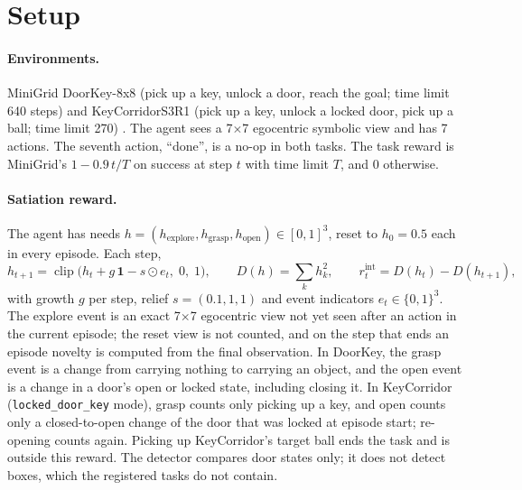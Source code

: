 \documentclass[11pt,letterpaper]{article}
\begin{document}
\section{Setup}
\label{sec:setup}

\paragraph{Environments.}
MiniGrid DoorKey-8x8 (pick up a key, unlock a door, reach the goal; time limit 640 steps) and KeyCorridorS3R1 (pick
up a key, unlock a locked door, pick up a ball; time limit 270) \citep{chevalier2023minigrid}. The agent sees a
7$\times$7 egocentric symbolic view and has 7 actions. The seventh action, ``done'', is a no-op in both tasks. The
task reward is MiniGrid's $1-0.9\,t/T$ on success at step $t$ with time limit $T$, and 0 otherwise.

\paragraph{Satiation reward.}
The agent has needs $h=(h_{\text{explore}},h_{\text{grasp}},h_{\text{open}})\in[0,1]^3$, reset to $h_0=0.5$ each
in every episode. Each step,
\begin{equation}
  h_{t+1}=\operatorname{clip}\bigl(h_t+g\,\mathbf{1}-s\odot e_t,\;0,\;1\bigr),\qquad
  D(h)=\textstyle\sum_k h_k^2,\qquad r^{\text{int}}_t=D(h_t)-D(h_{t+1}),
  \label{eq:sat}
\end{equation}
with growth $g$ per step, relief $s=(0.1,1,1)$ and event indicators $e_t\in\{0,1\}^3$. The explore event is an
exact 7$\times$7 egocentric view not yet seen after an action in the current episode; the reset view is not counted,
and on the step that ends an episode novelty is computed from the final observation. In DoorKey, the grasp event is
a change from carrying nothing to carrying an object, and the open event is a change in a door's open or locked
state, including closing it. In KeyCorridor (\texttt{locked\_door\_key} mode), grasp counts only picking up a key,
and open counts only a closed-to-open change of the door that was locked at episode start; re-opening counts again.
Picking up KeyCorridor's target ball ends the task and is outside this reward. The detector compares door states
only; it does not detect boxes, which the registered tasks do not contain.
\end{document}
